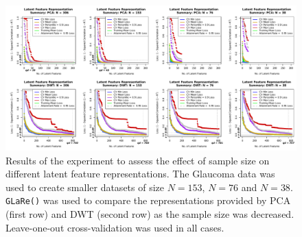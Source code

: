 \begin{figure}
    \centering
    \includegraphics[width=1\linewidth]{figures/eye-sample-size-results-results-real.pdf}
    \caption{Results of the experiment to assess the effect of sample size on different latent feature representations. The Glaucoma data was used to create smaller datasets of size $N=153$, $N=76$ and $N=38$. \texttt{GLaRe()} was used to compare the representations provided by PCA (first row) and DWT (second row) as the sample size was decreased. Leave-one-out cross-validation was used in all cases.}
    \label{fig:eye-sample-size-results-results-01}
\end{figure}